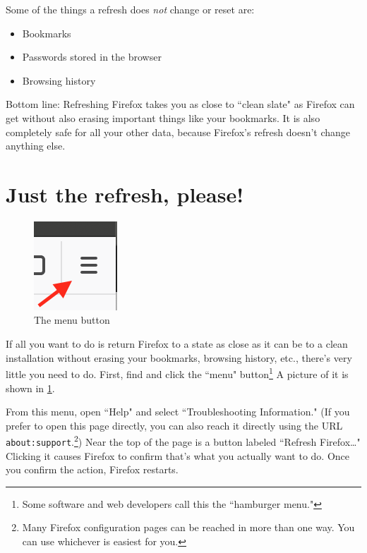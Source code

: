 \documentclass[fontsize=11pt]{article}
\begin{document}
Some of the things a refresh does \emph{not} change or reset are:
\begin{itemize}
	\item{Bookmarks}
	\item{Passwords stored in the browser}
	\item{Browsing history}
\end{itemize}


Bottom line:  Refreshing Firefox takes you as close to ``clean slate" as Firefox can get without also erasing important things like your bookmarks.  It is also completely safe for all your other data, because Firefox's refresh doesn't change anything else.





\section{Just the refresh, please!}\label{section:just-the-refresh-please}

\begin{figure}[h]
	\centering
	\includegraphics{images/hamburger-menu.png}
	\caption{The menu button}
	\label{fig:hamburger-menu}
\end{figure}

If all you want to do is return Firefox to a state as close as it can be to a clean installation without erasing your bookmarks, browsing history, etc., there's very little you need to do.  First, find and click the ``menu" button\footnote{Some software and web developers call this the ``hamburger menu."}  A picture of it is shown in \cref{fig:hamburger-menu}.

From this menu, open ``Help" and select ``Troubleshooting Information."  (If you prefer to open this page directly, you can also reach it directly using the URL \texttt{about:support}.\footnote{Many Firefox configuration pages can be reached in more than one way.  You can use whichever is easiest for you.})  Near the top of the page is a button labeled ``Refresh Firefox\ldots{}"  Clicking it causes Firefox to confirm that's what you actually want to do.  Once you confirm the action, Firefox restarts.
\end{document}
